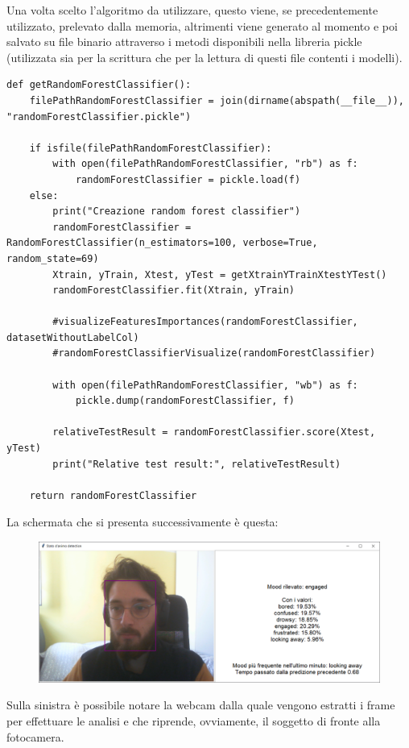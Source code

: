 Una volta scelto l’algoritmo da utilizzare, questo viene, se precedentemente utilizzato, prelevato dalla memoria, altrimenti viene generato al momento e poi salvato su file binario attraverso i metodi disponibili nella libreria pickle (utilizzata sia per la scrittura che per la lettura di questi file contenti i modelli).
\begin{verbatim}
def getRandomForestClassifier():
    filePathRandomForestClassifier = join(dirname(abspath(__file__)), "randomForestClassifier.pickle")

    if isfile(filePathRandomForestClassifier):
        with open(filePathRandomForestClassifier, "rb") as f:
            randomForestClassifier = pickle.load(f)
    else:
        print("Creazione random forest classifier")
        randomForestClassifier = RandomForestClassifier(n_estimators=100, verbose=True, random_state=69)
        Xtrain, yTrain, Xtest, yTest = getXtrainYTrainXtestYTest()
        randomForestClassifier.fit(Xtrain, yTrain)
        
        #visualizeFeaturesImportances(randomForestClassifier, datasetWithoutLabelCol)
        #randomForestClassifierVisualize(randomForestClassifier)

        with open(filePathRandomForestClassifier, "wb") as f:
            pickle.dump(randomForestClassifier, f)
        
        relativeTestResult = randomForestClassifier.score(Xtest, yTest)
        print("Relative test result:", relativeTestResult)

    return randomForestClassifier
\end{verbatim}
La schermata che si presenta successivamente è questa:
\begin{figure}
    \begin{center}    
        \includegraphics[width=0.9\linewidth]{images/image52.png}
    \end{center}
\end{figure}

Sulla sinistra è possibile notare la webcam dalla quale vengono estratti i frame per effettuare le analisi e che riprende, ovviamente, il soggetto di fronte alla fotocamera.

